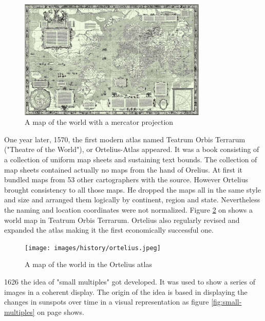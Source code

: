 \begin{figure}[h]
\centering
\includegraphics[width=0.8\textwidth,keepaspectratio]{images/history/mercator.png}
\caption[
    A map of the world with a mercator projection, Urldate: 07.2016 \newline
\small\texttt{\url{https://upload.wikimedia.org/wikipedia/commons/b/b2/Mercator_1569.png}}
]{A map of the world with a mercator projection}
\label{fig:mercator}
\end{figure}

One year later, 1570, the first modern atlas named Teatrum Orbis Terrarum ("Theatre of the World"), or Ortelius-Atlas appeared. It was a book consisting of a collection of uniform map sheets and sustaining text bounds. The collection of map sheets contained actually no maps from the hand of Orelius. At first it bundled maps from 53 other cartographers with the source. However Ortelius brought consistency to all those maps. He dropped the maps all in the same style and size and arranged them logically by continent, region and state. Nevertheless the naming and location coordinates were not normalized. Figure \ref{fig:ortelius} on \pageref{fig:ortelius} shows a world map in Teatrum Orbis Terrarum. Ortelius also regularly revised and expanded the atlas making it the first economically successful one.

\begin{figure}[h]
\centering
\texttt{[image: images/history/ortelius.jpeg]}
\caption[
    A map of the world in the Ortelius atlas, Urldate: 07.2016 \newline
\small\texttt{\url{https://upload.wikimedia.org/wikipedia/commons/6/6f/OrteliusWorldMap.jpeg}}
]{A map of the world in the Ortelius atlas}
\label{fig:ortelius}
\end{figure}

1626 the idea of "small multiples" got developed. It was used to show a series of images in a coherent display. The origin of the idea is based in displaying the changes in sunspots over time in a visual representation as figure \ref{fig:small-multiples} on page \pageref{fig:small-multiples} shows.

